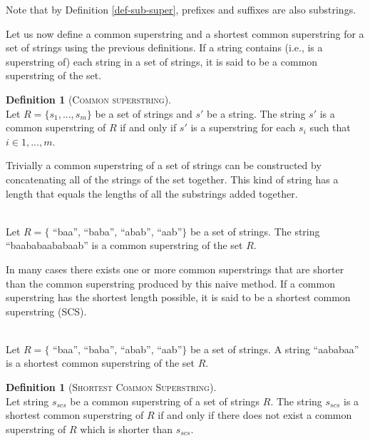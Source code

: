 \documentclass[english,twoside,censored,csm,algorithms-track-2020]{HYthesisML}
\theoremstyle{plain}
\theoremstyle{definition}
\newtheorem{definition}[theorem]{Definition}
\newcounter{testexample}
\numberwithin{testexample}{chapter}
\begin{document}
Note that by Definition \ref{def-sub-super}, prefixes and suffixes are also substrings.

Let us now define a common superstring and a shortest common superstring for a set of strings
using the previous definitions.
If a string contains (i.e., is a superstring of) each string in a set of strings, it is said to be
a common superstring of the set.

\begin{definition}[\textsc{Common superstring}]~\label{def-cs}\\
  Let $R = \{s_1,...,s_m\}$ be a set of strings and $s'$ be a string.
  The string $s'$ is a common superstring of $R$ if and only if $s'$ is a superstring
  for each $s_i$ such that $i\in 1,...,m$.
\end{definition}

Trivially a common superstring of a set of strings can be constructed by concatenating all of
the strings of the set together.
This kind of string has a length that equals the lengths of all the substrings added together.

\begin{testexample}~\label{exml-cs}\\
  Let $R=\{$ ``baa'', ``baba'', ``abab'', ``aab''$\}$ be a set of strings.
  The string ``baababaababaab'' is a common superstring of the set $R$.
\end{testexample}

In many cases there exists one or more common superstrings that are shorter than the common
superstring produced by this naive method.
If a common superstring has the shortest length possible, it is said to be a shortest common superstring (SCS).

\begin{testexample}~\label{exml-scs}\\
  Let $R=\{$ ``baa'', ``baba'', ``abab'', ``aab''$\}$ be a set of strings.
  A string ``aababaa'' is a shortest common superstring of the set $R$.
\end{testexample}

\begin{definition}[\textsc{Shortest Common Superstring}]~\label{def-scs}\\
  Let string $s_{scs}$ be a common superstring of a set of strings $R$.
  The string $s_{scs}$ is a shortest common superstring of $R$ if and only if there does not exist
  a common superstring of $R$ which is shorter than $s_{scs}$.
\end{definition}
\end{document}
